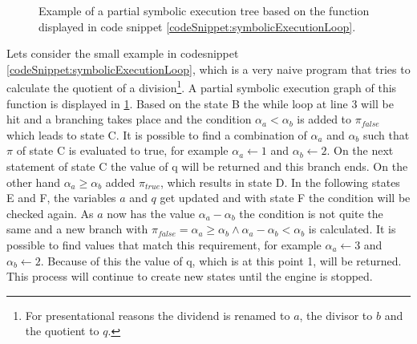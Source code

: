 \begin {figure}[!ht]
\begin{adjustbox}{width=\columnwidth}
\end{adjustbox}
\caption{Example of a partial symbolic execution tree based on the function displayed in code snippet \ref{codeSnippet:symbolicExecutionLoop}.}
\label{fig:sym_tree_loop}
\end{figure}
Lets consider the small example in codesnippet \ref{codeSnippet:symbolicExecutionLoop}, which is a very naive program that tries to calculate the quotient of a division\footnote{For presentational reasons the dividend is renamed to $a$, the divisor to $b$ and the quotient to $q$.}. A partial symbolic execution graph of this function is displayed in \ref{fig:sym_tree_loop}. Based on the state B the while loop at line 3 will be hit and a branching takes place and the condition $\alpha_a < \alpha_b$ is added to $\pi_{false}$ which leads to state C. It is possible to find a combination of $\alpha_a$ and $\alpha_b$ such that $\pi$ of state C is evaluated to true, for example $\alpha_a \gets 1$ and $\alpha_b \gets 2$. On the next statement of state C the value of q will be returned and this branch ends. On the other hand $\alpha_a \geq \alpha_b$ added $\pi_{true}$, which results in state D. In the following states E and F, the variables $a$ and $q$ get updated and with state F the condition will be checked again. As $a$ now has the value $\alpha_a - \alpha_b$ the condition is not quite the same and a new branch with $\pi_{false} = \alpha_a \geq \alpha_b \land \alpha_a - \alpha_b < \alpha_b$ is calculated. It is possible to find values that match this requirement, for example $\alpha_a \gets 3$ and $\alpha_b \gets 2$. Because of this the value of q, which is at this point 1, will be returned. This process will continue to create new states until the engine is stopped.

